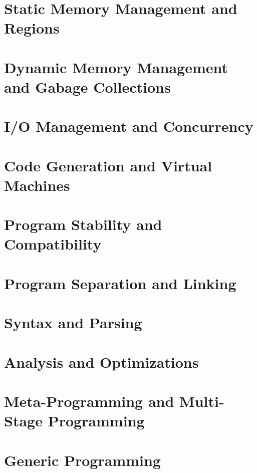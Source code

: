 \documentclass[
  luatex,
  japanese,
  unicode,
  titlepage,
  pdfusetitle
]{ltjsbook}
\begin{document}
\chapter{Static Memory Management and Regions}

\chapter{Dynamic Memory Management and Gabage Collections}




\chapter{I/O Management and Concurrency}

\chapter{Code Generation and Virtual Machines}

\chapter{Program Stability and Compatibility}

\chapter{Program Separation and Linking}

\chapter{Syntax and Parsing}






\chapter{Analysis and Optimizations}

\chapter{Meta-Programming and Multi-Stage Programming}

\chapter{Generic Programming}
\end{document}
